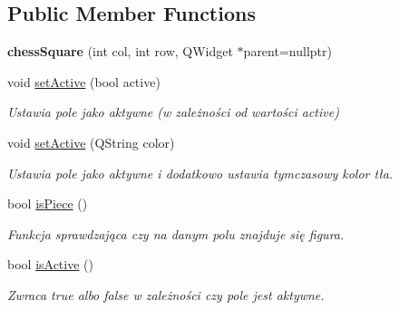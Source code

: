 \subsection*{Public Member Functions}
\begin{DoxyCompactItemize}
\item 
\mbox{\label{classchess_square_a818660e4b5fc11c1749a9af5b9a35aff}} 
{\bfseries chess\+Square} (int col, int row, Q\+Widget $\ast$parent=nullptr)
\item 
\mbox{\label{classchess_square_a2393c2aee673f38f121a82562707c740}} 
void \hyperlink{classchess_square_a2393c2aee673f38f121a82562707c740}{set\+Active} (bool active)
\begin{DoxyCompactList}\small\item\em Ustawia pole jako aktywne (w zależności od wartości active) \end{DoxyCompactList}\item 
\mbox{\label{classchess_square_a36cdc0a51aa436eb4fe0ee70cfc80bc9}} 
void \hyperlink{classchess_square_a36cdc0a51aa436eb4fe0ee70cfc80bc9}{set\+Active} (Q\+String color)
\begin{DoxyCompactList}\small\item\em Ustawia pole jako aktywne i dodatkowo ustawia tymczasowy kolor tła. \end{DoxyCompactList}\item 
\mbox{\label{classchess_square_ac8ae6f86143d988ab3c9d54c89c2784f}} 
bool \hyperlink{classchess_square_ac8ae6f86143d988ab3c9d54c89c2784f}{is\+Piece} ()
\begin{DoxyCompactList}\small\item\em Funkcja sprawdzająca czy na danym polu znajduje się figura. \end{DoxyCompactList}\item 
\mbox{\label{classchess_square_ad099713945d1e0a01514cf8b939a34b1}} 
bool \hyperlink{classchess_square_ad099713945d1e0a01514cf8b939a34b1}{is\+Active} ()
\begin{DoxyCompactList}\small\item\em Zwraca true albo false w zależności czy pole jest aktywne. \end{DoxyCompactList}\item 

\end{DoxyCompactItemize}
